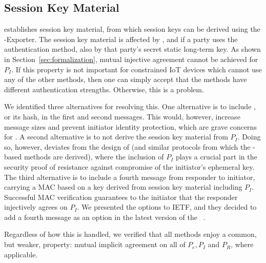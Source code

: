 \documentclass[a4paper,twoside]{article}
\begin{document}
\subsection{Session Key Material}
\label{sec:sessionKeyMaterial}
\mEdhoc{} establishes session key material, from which session keys
can be derived using the \mEdhoc{}-Exporter.
%
The session key material is affected by \mGxy{}, and if a party uses the
\mStat{} authentication method, also by that party's secret static long-term key.
%
As shown in Section~\ref{sec:formalization}, mutual injective agreement cannot
be achieved for $P_I$.
%
If this property is not important for constrained IoT devices which cannot use
any of the other methods, then one can simply accept that the methods have
different authentication strengths.
%
Otherwise, this is a problem.
%

We identified three alternatives for resolving this.
%
One alternative is to include \mIdcredi{}, or its hash, in the first and
second messages.
%
This would, however, increase message sizes and prevent initiator identity
protection, which are grave concerns for \mEdhoc{}.
%
A second alternative is to not derive the session key material from $P_I$.
%
Doing so, however, deviates from the design of \mOptls{} (and similar protocols
from which the \mStat{}-based methods are derived), where the inclusion of
$P_I$ plays a crucial part in the security proof of resistance against
compromise of the initiator's ephemeral key.
%
The third alternative is to include a fourth message from responder to initiator,
carrying a MAC based on a key derived from session key material including $P_I$.
%
Successful MAC verification guarantees
to the initiator that the responder injectively agrees on $P_I$.
%
We presented the options to IETF, and they decided to add a
fourth message as an option in the latest version of the
\mSpec{}~\cite{latest-ietf-lake-edhoc-05}.
%

Regardless of how this is handled, we verified that all methods
enjoy a common, but weaker, property: mutual implicit agreement
on all of $P_e, P_I$ and $P_R$, where applicable.
%

\end{document}
